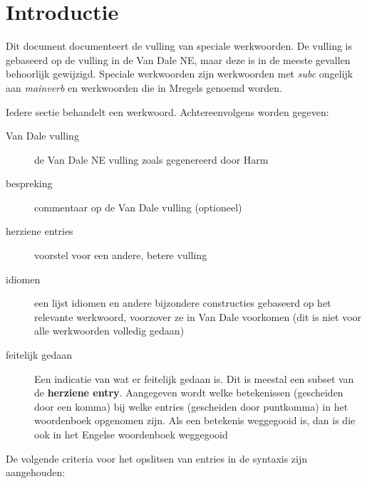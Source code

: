 
   \RosSupersedes{-}
   \MakeRosTitle
%
%

\def\PP{$\wp$}
\def\to{$\rightarrow$}
\section{Introductie}

Dit document documenteert  de vulling van speciale werkwoorden. De vulling
is gebaseerd op de vulling in de Van Dale NE, maar deze is in de meeste
gevallen behoorlijk gewijzigd.
Speciale werkwoorden zijn werkwoorden met {\em subc} ongelijk aan
{\em  mainverb} en werkwoorden die in Mregels genoemd worden.

Iedere sectie behandelt een werkwoord. Achtereenvolgens worden gegeven:

\begin{description}
\item[Van Dale vulling] de Van Dale NE vulling zoals gegenereerd door Harm
\item[bespreking] commentaar op de Van Dale vulling (optioneel)
\item[herziene entries] voorstel voor een andere, betere vulling
\item[idiomen] een lijst idiomen en andere bijzondere constructies gebaseerd
op het relevante werkwoord, voorzover ze in Van Dale voorkomen (dit is niet
voor alle werkwoorden volledig gedaan)
\item[feitelijk gedaan] Een indicatie van wat er feitelijk gedaan is. Dit is
meestal een subset van de {\bf herziene entry}. Aangegeven wordt welke
betekenissen
(gescheiden door een komma) bij welke entries (gescheiden door puntkomma)
in het woordenboek opgenomen zijn.
Als een betekenis weggegooid is, dan is die ook in het Engelse woordenboek
weggegooid
\end{description}

\noindent
De volgende criteria voor het opslitsen van entries in de syntaxis zijn
aangehouden:

